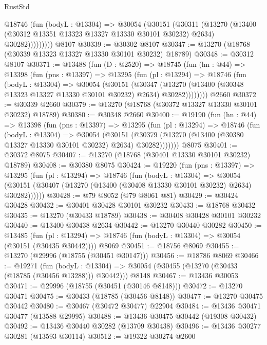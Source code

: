 \begin{lexlean}{RustStd}
\begin{coremodule}
            @18746
              (fun (bodyL : @13304) =>
              @30054
                (@30151
                  (@30311
                    (@13270
                      (@13400 (@30312 @13351 @13323 @13327 @13330 @30101 @30232) @2634)
                      @30282)))))))))
    @8107
@30339 := @30302 @8107
@30347 := @13270 (@18768 (@30339 @13323 @13327 @13330 @30101 @30232) @18789)
@30348 := @30312 @8107
@30371 := @13488
    (fun (D : @2520) =>
    @18745
      (fun (hn : @44) =>
      @13398
        (fun (pns : @13397) =>
        @13295
          (fun (pl : @13294) =>
          @18746
            (fun (bodyL : @13304) =>
            @30054
              (@30151
                (@30347
                  (@13270 (@13400 (@30348 @13323 @13327 @13330 @30101 @30232) @2634) @30282))))))))
    @2660
@30372 := @30339 @2660
@30379 := @13270 (@18768 (@30372 @13327 @13330 @30101 @30232) @18789)
@30380 := @30348 @2660
@30400 := @19190
    (fun (hn : @44) =>
    @13398
      (fun (pns : @13397) =>
      @13295
        (fun (pl : @13294) =>
        @18746
          (fun (bodyL : @13304) =>
          @30054
            (@30151
              (@30379 (@13270 (@13400 (@30380 @13327 @13330 @30101 @30232) @2634) @30282)))))))
    @8075
@30401 := @30372 @8075
@30407 := @13270 (@18768 (@30401 @13330 @30101 @30232) @18789)
@30408 := @30380 @8075
@30424 := @19220
    (fun (pns : @13397) =>
    @13295
      (fun (pl : @13294) =>
      @18746
        (fun (bodyL : @13304) =>
        @30054 (@30151 (@30407 (@13270 (@13400 (@30408 @13330 @30101 @30232) @2634) @30282))))))
@30428 := @79 @8052 (@79 @8061 @81)
@30429 := @30424 @30428
@30432 := @30401 @30428 @30101 @30232
@30433 := @18768 @30432
@30435 := @13270 (@30433 @18789)
@30438 := @30408 @30428 @30101 @30232
@30440 := @13400 @30438 @2634
@30442 := @13270 @30440 @30282
@30450 := @13485
    (fun (pl : @13294) => @18746 (fun (bodyL : @13304) => @30054 (@30151 (@30435 @30442))))
    @8069
@30451 := @18756 @8069
@30455 := @13270 (@29996 (@18755 (@30451 @30147)))
@30456 := @18786 @8069
@30466 := @19271
    (fun (bodyL : @13304) => @30054 (@30455 (@13270 (@30433 (@18785 (@30456 @13288))) @30442)))
    @8148
@30467 := @13436 @30053
@30471 := @29996 (@18755 (@30451 (@30146 @8148)))
@30472 := @13270 @30471
@30475 := @30433 (@18785 (@30456 @8148))
@30477 := @13270 @30475 @30442
@30480 := @30467 (@30472 @30477) @22904
@30484 := @13436 @30471 @30477 (@13588 @29995)
@30488 := @13436 @30475 @30442 (@19308 @30432)
@30492 := @13436 @30440 @30282 (@13709 @30438)
@30496 := @13436 @30277 @30281 (@13593 @30114)
@30512 := @19322
    @30274
    @2600

\end{coremodule}
\end{lexlean}
